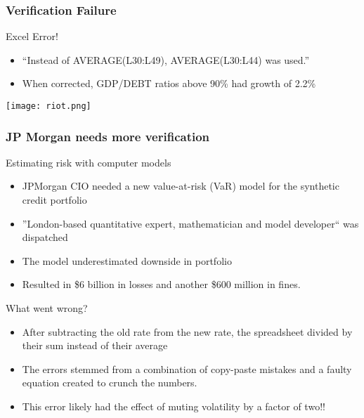 \documentclass[mathserif]{beamer}
\begin{document}
\begin{frame}
  \frametitle{Verification Failure}
  \begin{block}{Excel Error!}
    \begin{itemize}
     \item ``Instead of AVERAGE(L30:L49), AVERAGE(L30:L44) was used.''
     \item When corrected, GDP/DEBT ratios above 90\% had growth of 2.2\%
    \end{itemize}
  \end{block}

 \begin{center}
  \center
  \texttt{[image: riot.png]}\\
 \end{center}
 
\end{frame}

\begin{frame}
  \frametitle{JP Morgan needs more verification}
  \begin{block}{Estimating risk with computer models}
    \begin{itemize}
     \item JPMorgan CIO needed a new value-at-risk (VaR) model for the synthetic credit portfolio 
     \item ''London-based quantitative expert, mathematician and model developer`` was dispatched
     \item The model underestimated downside in portfolio
     \item Resulted in \$6 billion in losses and another \$600 million in fines.
    \end{itemize}
  \end{block}

  \begin{block}{What went wrong?}
    \begin{itemize}
     \item After subtracting the old rate from the new rate, the spreadsheet divided by their sum instead of their average
     \item The errors stemmed from a combination of copy-paste mistakes and a faulty equation created to crunch the numbers.
     \item This error likely had the effect of muting volatility by a factor of two!!
    \end{itemize}
  \end{block}
 
\end{frame}
\end{document}
